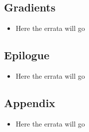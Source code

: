 \documentclass{article}
\begin{document}
\subsection*{Gradients}
\begin{itemize}
\item Here the errata will go
\end{itemize}

\subsection*{Epilogue}
\begin{itemize}
\item Here the errata will go
\end{itemize}

\subsection*{Appendix}
\begin{itemize}
\item Here the errata will go
\end{itemize}
\end{document}
